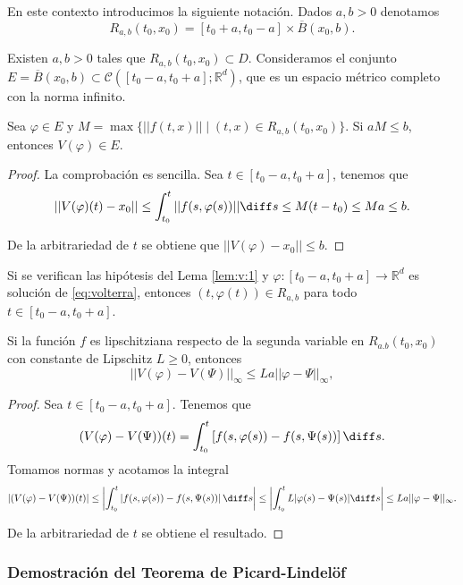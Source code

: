 \documentclass{article}
\begin{document}
En este contexto introducimos la siguiente notación. Dados $a,b > 0$ denotamos
\[R_{a,b}(t_0, x_0) = [t_0+a, t_0-a] \times \overline{B}(x_0, b).\]

Existen $a,b > 0$ tales que $R_{a,b}(t_0,x_0) \subset D$.  Consideramos el conjunto
$E = \overline{B}(x_0, b) \subset \mathcal{C}([t_0-a, t_0+a]; \mathbb{R}^d)$, que es un espacio
métrico completo con la norma infinito.

\begin{lemma} \label{lem:v:1} Sea $\varphi \in E$ y
  $M = \max \{||f(t,x)|| \mid (t,x) \in R_{a,b}(t_0, x_0)\}$. Si $aM \le b$, entonces
  $V(\varphi) \in E$.
\end{lemma}
\begin{proof}
  La comprobación es sencilla. Sea $t \in [t_0-a, t_0+a]$, tenemos que
  \[ ||V(\varphi)(t)-x_0|| \le \int_{t_0}^t ||f(s, \varphi(s))|| \diff s \le M(t-t_0) \le M a \le
    b.  \]

  De la arbitrariedad de $t$ se obtiene que $||V(\varphi)-x_0|| \le b$.
\end{proof}

\begin{remark}
  Si se verifican las hipótesis del Lema \ref{lem:v:1} y $\varphi: [t_0-a, t_0+a] \to \mathbb{R}^d$
  es solución de \eqref{eq:volterra}, entonces $(t, \varphi(t)) \in R_{a,b}$ para todo
  $t \in [t_0-a, t_0+a]$.
\end{remark}

\begin{lemma}
  Si la función $f$ es lipschitziana respecto de la segunda variable en $R_{a.b}(t_0, x_0)$ con
  constante de Lipschitz $L \ge 0$, entonces
  \[||V(\varphi) - V(\Psi)||_{\infty} \le La||\varphi - \Psi||_\infty,\]
\end{lemma}

\begin{proof}
  Sea $t \in [t_0-a, t_0+a]$. Tenemos que
  \[ (V(\varphi) - V(\Psi))(t) = \int_{t_{0}}^t \left[f(s, \varphi(s)) - f(s, \Psi(s))\right] \diff
    s.\] Tomamos normas y acotamos la integral
  \[|(V(\varphi) - V(\Psi))(t)| \le \left|\int_{t_{0}}^t \left|f(s, \varphi(s)) - f(s,
        \Psi(s))\right| \diff s\right| \le \left|\int_{t_{0}}^t L |\varphi(s) - \Psi(s)| \diff s
    \right| \le L a ||\varphi - \Psi||_{\infty}.\]

  De la arbitrariedad de $t$ se obtiene el resultado.
\end{proof}

\subsubsection{Demostración del Teorema de Picard-Lindelöf}
\end{document}
